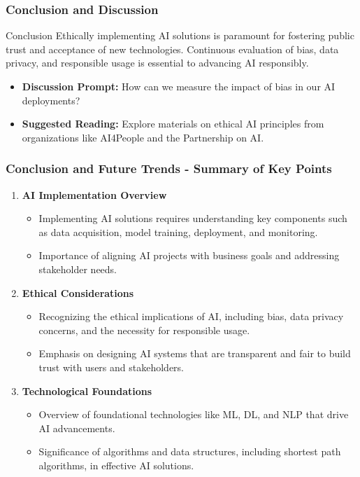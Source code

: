 \documentclass[aspectratio=169]{beamer}
\begin{document}
\begin{frame}[fragile]
    \frametitle{Conclusion and Discussion}
    \begin{block}{Conclusion}
        Ethically implementing AI solutions is paramount for fostering public trust and acceptance of new technologies. Continuous evaluation of bias, data privacy, and responsible usage is essential to advancing AI responsibly.
    \end{block}
    \begin{itemize}
        \item \textbf{Discussion Prompt:} How can we measure the impact of bias in our AI deployments?
        \item \textbf{Suggested Reading:} Explore materials on ethical AI principles from organizations like AI4People and the Partnership on AI.
    \end{itemize}
\end{frame}

\begin{frame}[fragile]
    \frametitle{Conclusion and Future Trends - Summary of Key Points}
    
    \begin{enumerate}
        \item \textbf{AI Implementation Overview}
        \begin{itemize}
            \item Implementing AI solutions requires understanding key components such as data acquisition, model training, deployment, and monitoring.
            \item Importance of aligning AI projects with business goals and addressing stakeholder needs.
        \end{itemize}
        
        \item \textbf{Ethical Considerations}
        \begin{itemize}
            \item Recognizing the ethical implications of AI, including bias, data privacy concerns, and the necessity for responsible usage.
            \item Emphasis on designing AI systems that are transparent and fair to build trust with users and stakeholders.
        \end{itemize}
        
        \item \textbf{Technological Foundations}
        \begin{itemize}
            \item Overview of foundational technologies like ML, DL, and NLP that drive AI advancements.
            \item Significance of algorithms and data structures, including shortest path algorithms, in effective AI solutions.
        \end{itemize}
    \end{enumerate}
\end{frame}
\end{document}
